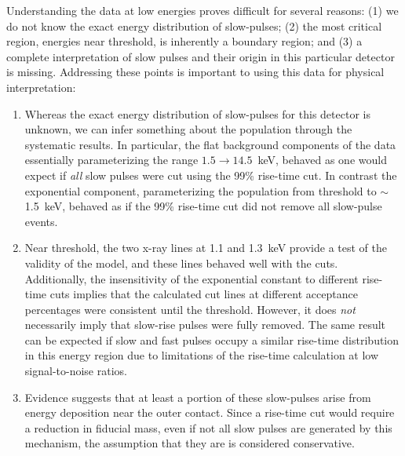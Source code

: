 	
	Understanding the data at low energies proves difficult for several reasons: (1) we do not know the exact energy distribution of slow-pulses; (2) the most critical region, energies near threshold, is inherently a boundary region; and (3) a complete interpretation of slow pulses and their origin in this particular detector is missing.  Addressing these points is important to using this data for physical interpretation:
	
	\begin{enumerate}
		\item Whereas the exact energy distribution of slow-pulses for this detector is unknown, we can infer something about the population through the systematic results.  In particular, the flat background components of the data essentially parameterizing the range $1.5\to14.5$~keV, behaved as one would expect if \emph{all} slow pulses were cut using the 99\% rise-time cut.  In contrast the exponential component, parameterizing the population from threshold to $\sim$1.5~keV, behaved as if the 99\% rise-time cut did not remove all slow-pulse events.  
		\item Near threshold, the two x-ray lines at 1.1 and 1.3~keV provide a test of the validity of the model, and these lines behaved well with the cuts.  Additionally, the insensitivity of the exponential constant to different rise-time cuts implies that the calculated cut lines at different acceptance percentages were consistent until the threshold.  However, it does \emph{not} necessarily imply that slow-rise pulses were fully removed.  The same result can be expected if slow and fast pulses occupy a similar rise-time distribution in this energy region due to limitations of the rise-time calculation at low signal-to-noise ratios.
		\item Evidence suggests that at least a portion of these slow-pulses arise from energy deposition near the outer contact.  %
		Since a rise-time cut would require a reduction in fiducial mass, even if not all slow pulses are generated by this mechanism, the assumption that they are is considered conservative.  
	\end{enumerate}
	
